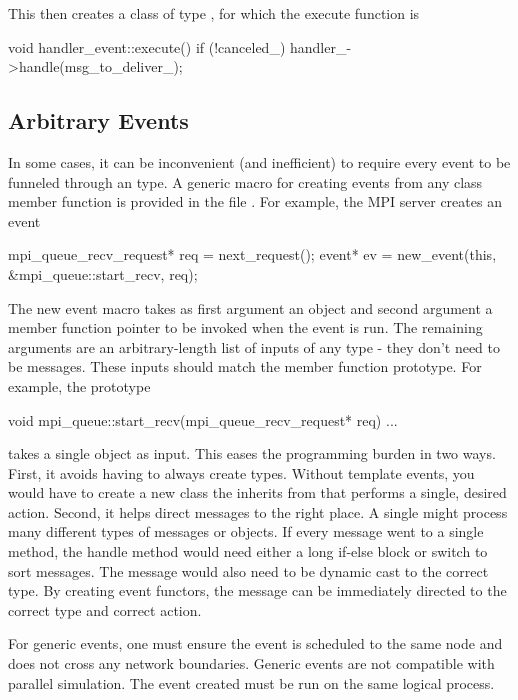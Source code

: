 This then creates a class of type , for which the execute function is

\begin{CppCode}
void
handler_event::execute()
{
  if (!canceled_) {
    handler_->handle(msg_to_deliver_);
  }
}
\end{CppCode}

\subsection{Arbitrary Events}
In some cases, it can be inconvenient (and inefficient) to require every event to be funneled through an \evhandler type.
A generic macro for creating events from any class member function is provided in the file .
For example, the MPI server creates an event

\begin{CppCode}
mpi_queue_recv_request* req = next_request();
event* ev = new_event(this, &mpi_queue::start_recv, req);
\end{CppCode}
The new event macro takes as first argument an object and second argument a member function pointer to be invoked when the event is run.
The remaining arguments are an arbitrary-length list of inputs of any type - they don't need to be messages. 
These inputs should match the member function prototype. 
For example, the prototype

\begin{CppCode}
void
mpi_queue::start_recv(mpi_queue_recv_request* req)
{
  ...
}
\end{CppCode}
takes a single  object as input.
This eases the programming burden in two ways.
First, it avoids having to always create \evhandler types.
Without template events, you would have to create a new class the inherits from \evhandler that performs a single, desired action.
Second, it helps direct messages to the right place.  A single \evhandler might process many different types of messages or objects.
If every message went to a single  method, the handle method would need either a long if-else block or switch to sort messages.
The message would also need to be dynamic cast to the correct type.
By creating event functors, the message can be immediately directed to the correct type and correct action.

For generic events, one must ensure the event is scheduled to the same node and does not cross any network boundaries.
Generic events are not compatible with parallel simulation.
The event created must be run on the same logical process.


